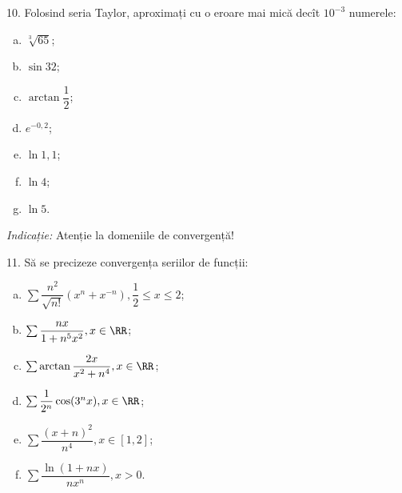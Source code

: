 \vspace{1cm}

10. Folosind seria Taylor, aproximați cu o eroare mai mică decît $ 10^{-3} $
numerele:
\begin{enumerate}[(a)]
\item $ \sqrt[3]{65} $;
\item $ \sin 32 $;
\item $ \arctan \dfrac{1}{2} $;
\item $ e^{-0,2} $;
\item $ \ln 1,1 $;
\item $ \ln 4 $;
\item $ \ln 5 $.
\end{enumerate}

\emph{Indicație:} Atenție la domeniile de convergență!

\vspace{1cm}

11. Să se precizeze convergența seriilor de funcții:
\begin{enumerate}[(a)]
\item $ \sum \dfrac{n^2}{\sqrt{n!}} (x^n + x^{-n}), \dfrac{1}{2} \leq x \leq 2 $;
\item $ \sum \dfrac{nx}{1 + n^5 x^2}, x \in \RR $;
\item $ \sum \arctan \dfrac{2x}{x^2 + n^4}, x \in \RR $;
\item $ \sum \dfrac{1}{2^n} \cos(3^n x), x \in \RR $;
\item $ \sum \dfrac{(x + n)^2}{n^4}, x \in [1, 2] $;
\item $ \sum \dfrac{\ln(1 + nx)}{nx^n}, x > 0 $.
\end{enumerate}



